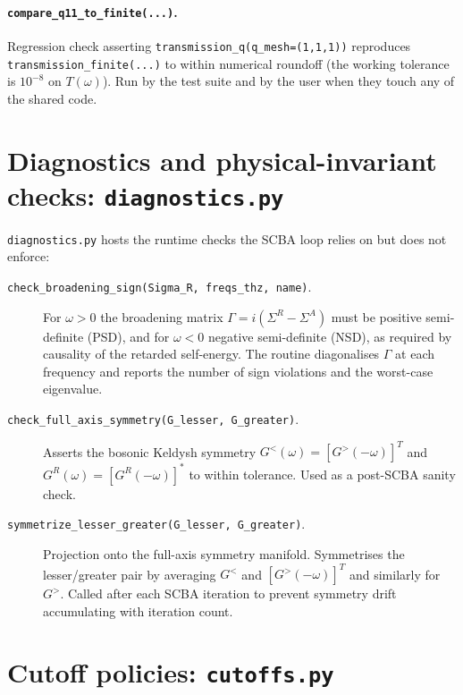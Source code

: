 \paragraph{\texttt{compare\_q11\_to\_finite(...)}.}  Regression check
asserting \texttt{transmission\_q(q\_mesh=(1,1,1))} reproduces
\texttt{transmission\_finite(...)} to within numerical roundoff (the
working tolerance is $10^{-8}$ on $T(\omega)$).  Run by the test
suite and by the user when they touch any of the shared code.

\section{Diagnostics and physical-invariant checks: \texttt{diagnostics.py}}
\label{sec:solver_diagnostics}

\texttt{diagnostics.py} hosts the runtime checks the SCBA loop relies
on but does not enforce:

\begin{description}
  \item[\texttt{check\_broadening\_sign(Sigma\_R, freqs\_thz, name)}.]
        For $\omega > 0$ the broadening matrix
        $\Gamma = i(\Sigma^R - \Sigma^A)$ must be positive semi-definite
        (PSD), and for $\omega < 0$ negative semi-definite (NSD), as
        required by causality of the retarded self-energy.  The
        routine diagonalises $\Gamma$ at each frequency and reports
        the number of sign violations and the worst-case eigenvalue.
  \item[\texttt{check\_full\_axis\_symmetry(G\_lesser, G\_greater)}.]
        Asserts the bosonic Keldysh symmetry
        $G^<(\omega) = [G^>(-\omega)]^T$ and
        $G^R(\omega) = [G^R(-\omega)]^*$ to within tolerance.  Used
        as a post-SCBA sanity check.
  \item[\texttt{symmetrize\_lesser\_greater(G\_lesser, G\_greater)}.]
        Projection onto the full-axis symmetry manifold.  Symmetrises
        the lesser/greater pair by averaging $G^<$ and $[G^>(-\omega)]^T$
        and similarly for $G^>$.  Called after each SCBA iteration to
        prevent symmetry drift accumulating with iteration count.
\end{description}

\section{Cutoff policies: \texttt{cutoffs.py}}
\label{sec:solver_cutoffs}

